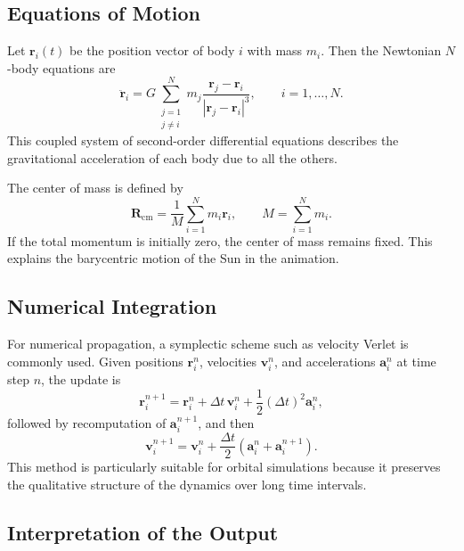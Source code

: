 \documentclass[12pt]{article}
\begin{document}
\subsection{Equations of Motion}

Let \(\mathbf{r}_i(t)\) be the position vector of body \(i\) with mass \(m_i\).
Then the Newtonian \(N\)-body equations are
\begin{equation}
\ddot{\mathbf{r}}_i
=
G \sum_{\substack{j=1 \\ j\neq i}}^{N}
m_j \frac{\mathbf{r}_j - \mathbf{r}_i}{\left|\mathbf{r}_j - \mathbf{r}_i\right|^3},
\qquad i=1,\dots,N.
\end{equation}
This coupled system of second-order differential equations describes the gravitational
acceleration of each body due to all the others.

The center of mass is defined by
\begin{equation}
\mathbf{R}_{\mathrm{cm}}
=
\frac{1}{M}\sum_{i=1}^{N} m_i \mathbf{r}_i,
\qquad
M = \sum_{i=1}^{N} m_i.
\end{equation}
If the total momentum is initially zero, the center of mass remains fixed.
This explains the barycentric motion of the Sun in the animation.

\subsection{Numerical Integration}

For numerical propagation, a symplectic scheme such as velocity Verlet is commonly
used. Given positions \(\mathbf{r}_i^n\), velocities \(\mathbf{v}_i^n\), and
accelerations \(\mathbf{a}_i^n\) at time step \(n\), the update is
\begin{equation}
\mathbf{r}_i^{n+1}
=
\mathbf{r}_i^n + \Delta t\,\mathbf{v}_i^n + \frac{1}{2}(\Delta t)^2 \mathbf{a}_i^n,
\end{equation}
followed by recomputation of \(\mathbf{a}_i^{n+1}\), and then
\begin{equation}
\mathbf{v}_i^{n+1}
=
\mathbf{v}_i^n + \frac{\Delta t}{2}\left(\mathbf{a}_i^n + \mathbf{a}_i^{n+1}\right).
\end{equation}
This method is particularly suitable for orbital simulations because it preserves
the qualitative structure of the dynamics over long time intervals.

\subsection{Interpretation of the Output}
\end{document}
